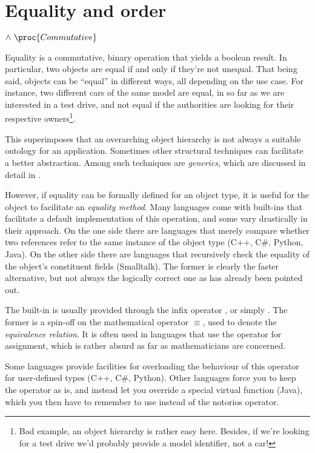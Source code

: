 \section{Equality and order}


\begin{codebox}
\zi $\wedge\ \proc{Commutative}$
\end{codebox}

Equality is a commutative, binary operation that yields a boolean result. In
particular, two objects are equal if and only if they're not unequal. That
being said, objects can be ``equal'' in different ways, all depending on the
use case. For instance, two different cars of the same model are equal, in so
far as we are interested in a test drive, and not equal if the authorities are
looking for their respective owners\footnote{Bad example, an object hierarchy
is rather easy here. Besides, if we're looking for a test drive we'd probably
provide a model identifier, not a car!}.

This superimposes that an overarching object hierarchy is not always a suitable
ontology for an application. Sometimes other structural techniques can
facilitate a better abstraction. Among such techniques are \emph{generics},
which are discussed in detail in .

However, if equality can be formally defined for an object type, it is useful
for the object to facilitate an \emph{equality method}. Many languages come
with built-ins that facilitate a default implementation of this operation, and
some vary drastically in their approach. On the one side there are languages
that merely compare whether two references refer to the same instance of the
object type (C++, C\#, Python, Java). On the other side there are languages
that recursively check the equality of the object's constituent fields
(Smalltalk).  The former is clearly the faster alternative, but not always the
logically correct one as has already been pointed out.

The built-in is usually provided through the infix operator \code{==}, or
simply \code{=}. The former is a spin-off on the mathematical operator
$\equiv$, used to denote the \emph{equivalence relation}. It is often used in
languages that use the \code{=} operator for assignment, which is rather absurd
as far as mathematicians are concerned.

Some languages provide facilities for overloading the behaviour of this
operator for user-defined types (C++, C\#, Python). Other languages force you
to keep the operator as is, and instead let you override a special virtual
function (Java), which you then have to remember to use instead of the notorios
\code{==} operator.


